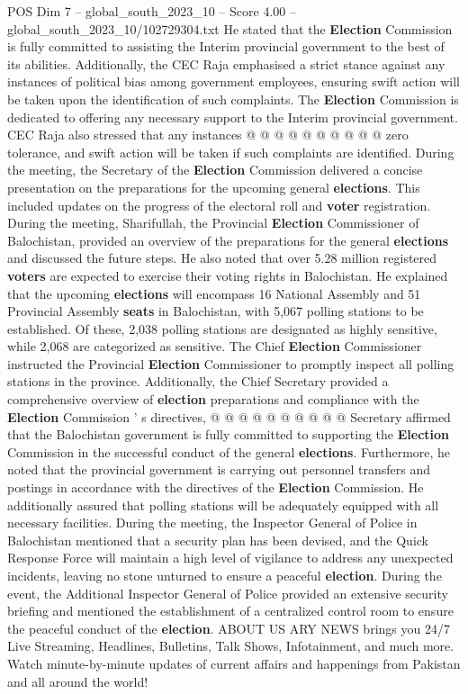 \begin{textsample}{POS Dim 7 – global\_south\_2023\_10 – Score 4.00 – global\_south\_2023\_10/102729304.txt}
He stated that the \textbf{Election} Commission is fully committed to assisting the Interim provincial government to the best of its abilities.
Additionally, the CEC Raja emphasised a strict stance against any instances of political bias among government employees, ensuring swift action will be taken upon the identification of such complaints.
The \textbf{Election} Commission is dedicated to offering any necessary support to the Interim provincial government.
CEC Raja also stressed that any instances @ @ @ @ @ @ @ @ @ @ zero tolerance, and swift action will be taken if such complaints are identified.
During the meeting, the Secretary of the \textbf{Election} Commission delivered a concise presentation on the preparations for the upcoming general \textbf{elections}.
This included updates on the progress of the electoral roll and \textbf{voter} registration.
During the meeting, Sharifullah, the Provincial \textbf{Election} Commissioner of Balochistan, provided an overview of the preparations for the general \textbf{elections} and discussed the future steps.
He also noted that over 5.28 million registered \textbf{voters} are expected to exercise their voting rights in Balochistan.
He explained that the upcoming \textbf{elections} will encompass 16 National Assembly and 51 Provincial Assembly \textbf{seats} in Balochistan, with 5,067 polling stations to be established.
Of these, 2,038 polling stations are designated as highly sensitive, while 2,068 are categorized as sensitive.
The Chief \textbf{Election} Commissioner instructed the Provincial \textbf{Election} Commissioner to promptly inspect all polling stations in the province.
Additionally, the Chief Secretary provided a comprehensive overview of \textbf{election} preparations and compliance with the \textbf{Election} Commission ' s directives, @ @ @ @ @ @ @ @ @ @ Secretary affirmed that the Balochistan government is fully committed to supporting the \textbf{Election} Commission in the successful conduct of the general \textbf{elections}.
Furthermore, he noted that the provincial government is carrying out personnel transfers and postings in accordance with the directives of the \textbf{Election} Commission.
He additionally assured that polling stations will be adequately equipped with all necessary facilities.
During the meeting, the Inspector General of Police in Balochistan mentioned that a security plan has been devised, and the Quick Response Force will maintain a high level of vigilance to address any unexpected incidents, leaving no stone unturned to ensure a peaceful \textbf{election}.
During the event, the Additional Inspector General of Police provided an extensive security briefing and mentioned the establishment of a centralized control room to ensure the peaceful conduct of the \textbf{election}.
ABOUT US ARY NEWS brings you 24/7 Live Streaming, Headlines, Bulletins, Talk Shows, Infotainment, and much more.
Watch minute-by-minute updates of current affairs and happenings from Pakistan and all around the world!

\end{textsample}
